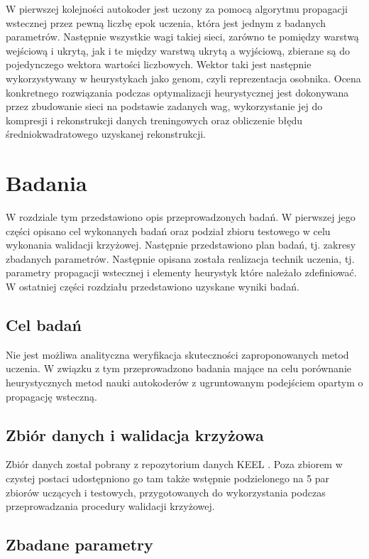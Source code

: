 \documentclass[11pt,a4paper,oneside]{report}
\begin{document}
W pierwszej kolejności autokoder jest uczony za pomocą algorytmu propagacji wstecznej przez pewną liczbę epok uczenia, która jest jednym z badanych parametrów. Następnie wszystkie wagi takiej sieci, zarówno te pomiędzy warstwą wejściową i ukrytą, jak i te między warstwą ukrytą a wyjściową, zbierane są do pojedynczego wektora wartości liczbowych. Wektor taki jest następnie wykorzystywany w heurystykach jako genom, czyli reprezentacja osobnika. Ocena konkretnego rozwiązania podczas optymalizacji heurystycznej jest dokonywana przez zbudowanie sieci na podstawie zadanych wag, wykorzystanie jej do kompresji i rekonstrukcji danych treningowych oraz obliczenie błędu średniokwadratowego uzyskanej rekonstrukcji. 

\chapter{Badania}

W rozdziale tym przedstawiono opis przeprowadzonych badań. W pierwszej jego części opisano cel wykonanych badań oraz podział zbioru testowego w celu wykonania walidacji krzyżowej. Następnie przedstawiono plan badań, tj. zakresy zbadanych parametrów. Następnie opisana została realizacja technik uczenia, tj. parametry propagacji wstecznej i elementy heurystyk które należało zdefiniować. W ostatniej części rozdziału przedstawiono uzyskane wyniki badań.

\section{Cel badań}

Nie jest możliwa analityczna weryfikacja skuteczności zaproponowanych metod uczenia. W związku z tym przeprowadzono badania mające na celu porównanie heurystycznych metod nauki autokoderów z ugruntowanym podejściem opartym o propagację wsteczną.

\section{Zbiór danych i walidacja krzyżowa}

Zbiór danych został pobrany z repozytorium danych KEEL \cite{alcala2010keel}. Poza zbiorem w czystej postaci udostępniono go tam także wstępnie podzielonego na 5 par zbiorów uczących i testowych, przygotowanych do wykorzystania podczas przeprowadzania procedury walidacji krzyżowej.

\section{Zbadane parametry}
\end{document}
